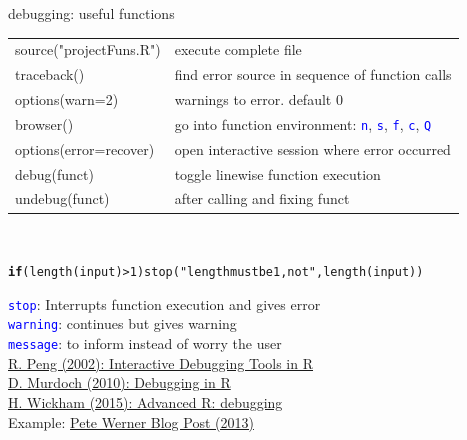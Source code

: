 \documentclass[xcolor=table,       handout,    xcolor=dvipsnames]{beamer}\usepackage[]{graphicx}\usepackage[]{color}
\makeatletter
\newcommand{\hlnum}[1]{\textcolor[rgb]{0,0,0}{#1}}
\newcommand{\hlstr}[1]{\textcolor[rgb]{0.545,0.137,0.137}{#1}}
\newcommand{\hlopt}[1]{\textcolor[rgb]{0,0,0}{#1}}
\newcommand{\hlstd}[1]{\textcolor[rgb]{0,0,0}{#1}}
\newcommand{\hlkwa}[1]{\textcolor[rgb]{1,0,0}{\textbf{#1}}}
\newcommand{\hlkwd}[1]{\textcolor[rgb]{0,0,1}{#1}}
\newenvironment{kframe}{%
 \def\at@end@of@kframe{}%
 \ifinner\ifhmode%
  \def\at@end@of@kframe{\end{minipage}}%
  \begin{minipage}{\columnwidth}%
 \fi\fi%
 \def\FrameCommand##1{\hskip\@totalleftmargin \hskip-\fboxsep
 \colorbox{shadecolor}{##1}\hskip-\fboxsep
     \hskip-\linewidth \hskip-\@totalleftmargin \hskip\columnwidth}%
 \MakeFramed {\advance\hsize-\width
   \@totalleftmargin\z@ \linewidth\hsize
   \@setminipage}}%
 {\par\unskip\endMakeFramed%
 \at@end@of@kframe}
\newenvironment{knitrout}{}{} %
\newcommand{\rcode}[1]{\texttt{\textcolor{Blue}{#1}}} %
\makeatother
\begin{document}
\begin{frame}[fragile]{debugging: useful functions}
\begin{tabular}{ll}
\pause source("projectFuns.R") & execute complete file\\
\pause traceback() & find error source in sequence of function calls\\
\pause options(warn=2) & warnings to error. default 0\\
\pause browser() & go into function environment: \rcode{n}, \rcode{s}, \rcode{f}, \rcode{c}, \rcode{Q}\\
\pause \alert{options(error=recover)} & \alert{open interactive session where error occurred}\\
\pause debug(funct) & toggle linewise function execution\\
\pause undebug(funct) & after calling and fixing funct\\
\end{tabular}\\
\pause
\vspace{-0.5em}
\begin{knitrout}\footnotesize
{}\color{fgcolor}\begin{kframe}
\begin{alltt}
\hlkwa{if}\hlstd{(}\hlkwd{length}\hlstd{(input)}\hlopt{>}\hlnum{1}\hlstd{)} \hlkwd{stop}\hlstd{(}\hlstr{"length must be 1, not "}\hlstd{,} \hlkwd{length}\hlstd{(input))}
\end{alltt}
\end{kframe}
\end{knitrout}
\vspace{-1em}
\pause
\rcode{stop}: Interrupts function execution and gives error\\
\rcode{warning}: continues but gives warning\\
\rcode{message}: to inform instead of worry the user\\[1em]
\pause
\href{http://www.biostat.jhsph.edu/~rpeng/docs/R-debug-tools.pdf}{R. Peng (2002): Interactive Debugging Tools in R}\\
\href{http://www.stats.uwo.ca/faculty/murdoch/software/debuggingR/}{D. Murdoch (2010): Debugging in R}\\
\href{http://adv-r.had.co.nz/Exceptions-Debugging.html}{H. Wickham (2015): Advanced R: debugging}\\
Example: \href{https://www.r-bloggers.com/tracking-down-errors-in-r/}{Pete Werner Blog Post (2013)}
\end{frame}
\end{document}
